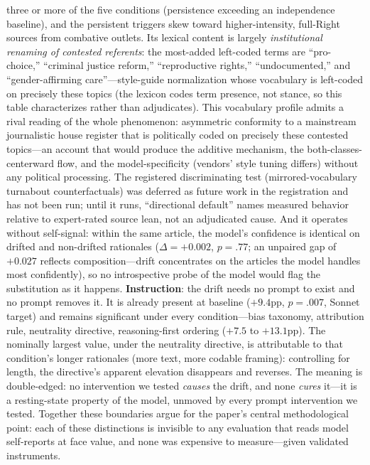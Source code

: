 \documentclass{article}
\begin{document}
three or more of the five conditions (persistence exceeding an
independence baseline), and the persistent triggers skew toward
higher-intensity, full-Right sources from combative outlets. Its
lexical content is largely \emph{institutional renaming of contested
referents}: the most-added left-coded terms are ``pro-choice,''
``criminal justice reform,'' ``reproductive rights,'' ``undocumented,''
and ``gender-affirming care''---style-guide normalization whose
vocabulary is left-coded on precisely these topics (the lexicon codes
term presence, not stance, so this table characterizes rather than
adjudicates). This vocabulary profile admits a rival reading of the
whole phenomenon: asymmetric conformity to a mainstream journalistic
house register that is politically coded on precisely these contested
topics---an account that would produce the additive mechanism, the
both-classes-centerward flow, and the model-specificity (vendors' style
tuning differs) without any political processing. The registered
discriminating test (mirrored-vocabulary turnabout counterfactuals) was
deferred as future work in the registration and has not been run; until
it runs, ``directional default'' names measured behavior relative to
expert-rated source lean, not an adjudicated cause. And it operates without self-signal: within the same
article, the model's confidence is identical on drifted and non-drifted
rationales ($\Delta=+0.002$, $p=.77$; an unpaired gap of $+0.027$
reflects composition---drift concentrates on the articles the model
handles most confidently), so no introspective probe of the model would
flag the substitution as it happens.
\textbf{Instruction}: the drift needs no prompt to exist and no prompt
removes it. It is already present at baseline ($+9.4$pp, $p=.007$,
Sonnet target) and remains significant under every condition---bias taxonomy,
attribution rule, neutrality directive, reasoning-first ordering
($+7.5$ to $+13.1$pp). The nominally largest value, under the
neutrality directive, is attributable to that condition's longer rationales
(more text, more codable framing): controlling for length, the
directive's apparent elevation disappears and reverses. The meaning is
double-edged: no intervention we tested \emph{causes} the drift, and
none \emph{cures} it---it is a resting-state property of the model,
unmoved by every prompt intervention we tested. Together
these boundaries argue for the paper's central methodological point:
each of these distinctions is invisible to any evaluation that reads
model self-reports at face value, and none was expensive to
measure---given validated instruments.
\end{document}
